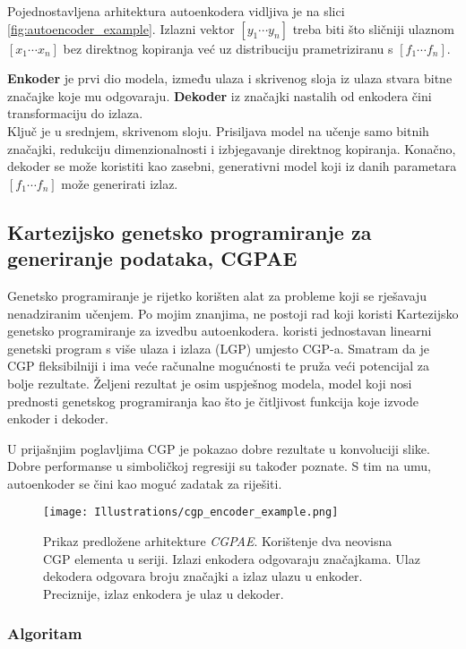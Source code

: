 Pojednostavljena arhitektura autoenkodera vidljiva je na slici \ref{fig:autoencoder_example}.
Izlazni vektor $[y_1 \cdots y_n]$ treba biti što sličniji ulaznom $[x_1 \cdots x_n]$ bez direktnog kopiranja već uz distribuciju prametriziranu s $[f_1 \cdots f_n]$.

\textbf{Enkoder} je prvi dio modela, između ulaza i skrivenog sloja iz ulaza stvara bitne značajke koje mu odgovaraju.
\textbf{Dekoder} iz značajki nastalih od enkodera čini transformaciju do izlaza. \\
Ključ je u srednjem, skrivenom sloju.
Prisiljava model na učenje samo bitnih značajki, redukciju dimenzionalnosti i izbjegavanje direktnog kopiranja.
Konačno, dekoder se može koristiti kao zasebni, generativni model koji iz danih parametara $[f_1 \cdots f_n]$ može generirati izlaz.
\subsection{Kartezijsko genetsko programiranje za generiranje podataka, CGPAE}
Genetsko programiranje je rijetko korišten alat za probleme koji se rješavaju nenadziranim učenjem.
Po mojim znanjima, ne postoji rad koji koristi Kartezijsko genetsko programiranje za izvedbu autoenkodera.
\cite{why_ae_diff} koristi jednostavan linearni genetski program s više ulaza i izlaza (LGP) umjesto CGP-a.
Smatram da je CGP fleksibilniji i ima veće računalne mogućnosti te pruža veći potencijal za bolje rezultate.
Željeni rezultat je osim uspješnog modela, model koji nosi prednosti genetskog programiranja kao što je čitljivost funkcija koje izvode enkoder i dekoder.

U prijašnjim poglavljima CGP je pokazao dobre rezultate u konvoluciji slike.
Dobre performanse u simboličkoj regresiji su također poznate.
S tim na umu, autoenkoder se čini kao moguć zadatak za riješiti.

\begin{figure}[H]
	\centering
	\texttt{[image: Illustrations/cgp\_encoder\_example.png]}
	\caption{Prikaz predložene arhitekture \emph{CGPAE}. Korištenje dva neovisna CGP elementa u seriji. Izlazi enkodera odgovaraju značajkama. Ulaz dekodera odgovara broju značajki a izlaz ulazu u enkoder. Preciznije, izlaz enkodera je ulaz u dekoder.}
\end{figure}

\subsubsection{Algoritam}
